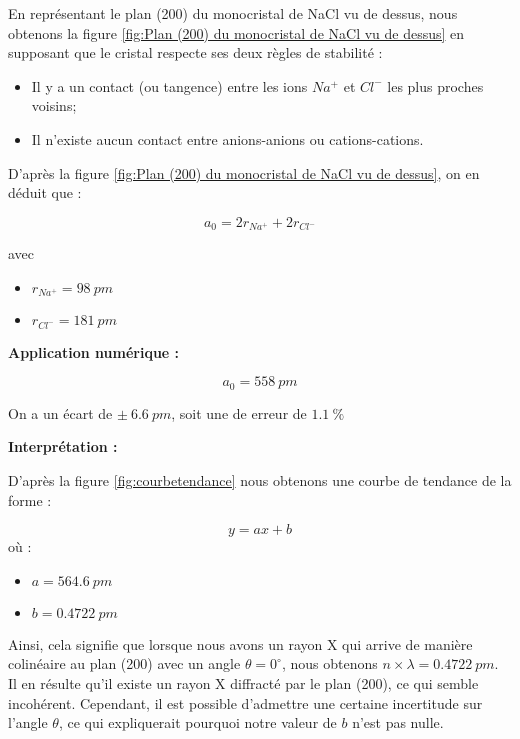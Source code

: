 En représentant le plan (200) du monocristal de NaCl vu de dessus, nous obtenons la figure \ref{fig:Plan (200) du monocristal de NaCl vu de dessus} en supposant que le cristal respecte ses deux règles de stabilité :

\begin{itemize}
	\item Il y a un contact (ou tangence) entre les ions $Na^+$ et $Cl^-$ les plus proches voisins;
	\item Il n'existe aucun contact entre anions-anions ou cations-cations.
\end{itemize}
	



	
	
	D'après la figure \ref{fig:Plan (200) du monocristal de NaCl vu de dessus}, on en déduit que :
	
	\begin{equation}
		a_0 = 2r_{Na^+}+2r_{Cl^-}
	\end{equation}

avec 
\begin{itemize}
	\item $r_{Na^+}= 98 \ pm$
	\item $r_{Cl^-}= 181 \ pm $	
\end{itemize}


\vspace{0.2cm}

\begin{flushleft}
	\textbf{Application numérique :}
\end{flushleft}

	
	\begin{equation}
		a_0 = 558 \ pm
	\end{equation}
	
On a un écart de $ \pm \ 6.6\  pm$,  soit une de erreur de $1.1 \ \%$
\begin{flushleft}
	\textbf{Interprétation :}
\end{flushleft}


D'après la figure \ref{fig:courbetendance} nous obtenons une courbe de tendance de la forme :

\begin{equation}
	y=a x + b
\end{equation}
où :
\begin{itemize}
	\item $a =564.6 \ pm$ 
	\item $b = 0.4722 \ pm$
\end{itemize}
\vspace{0.2cm}
Ainsi, cela signifie que lorsque nous avons un rayon X qui arrive de manière colinéaire au plan (200) avec un angle $\theta = 0^\circ$, nous obtenons $n \times \lambda = 0.4722 \ pm$. Il en résulte qu'il existe un rayon X diffracté par le plan (200), ce qui semble incohérent. Cependant, il est possible d'admettre une certaine incertitude sur l'angle $\theta$, ce qui expliquerait pourquoi notre valeur de $b$ n'est pas nulle.



